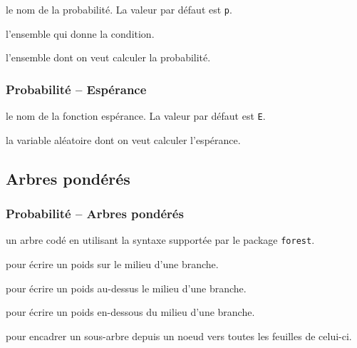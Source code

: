 \documentclass[12pt,a4paper]{article}
\theoremstyle{definition}
\newcommand\extraspace{
	\vspace{0.25em}
}
\begin{document}

\extraspace




\IDoption{} le nom de la probabilité. La valeur par défaut est \verb+p+.

 l'ensemble qui donne la condition.

 l'ensemble dont on veut calculer la probabilité.





\subsubsection{Probabilité -- Espérance}


\IDoption{} le nom de la fonction espérance. La valeur par défaut est \verb+E+.

\IDarg{} la variable aléatoire dont on veut calculer l'espérance.
\subsection{Arbres pondérés}

\subsubsection{Probabilité -- Arbres pondérés}



\Content{} un arbre codé en utilisant la syntaxe supportée par le package \verb+forest+.

 pour écrire un poids sur le milieu d'une branche.

 pour écrire un poids au-dessus le milieu d'une branche.

 pour écrire un poids en-dessous du milieu d'une branche.

 pour encadrer un sous-arbre depuis un noeud vers toutes les feuilles de celui-ci.
\newpage
\end{document}
